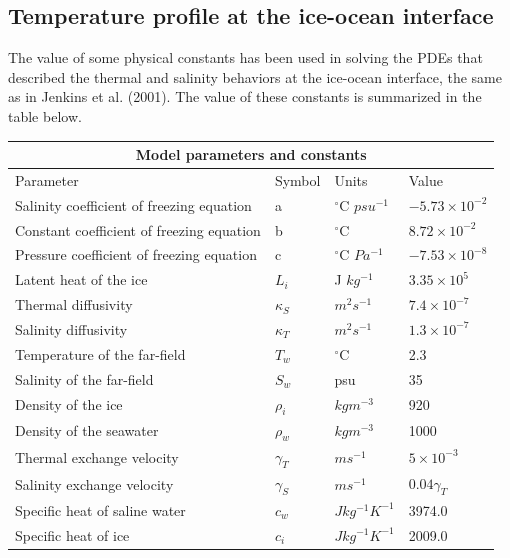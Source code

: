 \documentclass[11pt,a4paper]{article}
\begin{document}
	\subsection{Temperature profile at the ice-ocean interface}
	
	The value of some physical constants has been used in solving the PDEs that described the thermal and salinity behaviors at the ice-ocean interface, the same as in Jenkins et al. (2001). The value of these constants is summarized in the table below.\\
	
	\begin{tabular}{ |p{8cm}||p{2cm}|p{3cm}|p{3cm}|}
		\hline
		\multicolumn{4}{|c|}{Model parameters and constants} \\
		\hline
		Parameter &Symbol&Units&Value\\
		\hline
		Salinity coefficient of freezing equation &a& $^{\circ}$C $psu^{-1}$&   $-5.73\times10^{-2}$\\
		Constant coefficient of freezing equation &b&  $^{\circ}$C  & $8.72\times 10^{-2}$\\
		Pressure coefficient of freezing equation& c&$^{\circ}$C $Pa^{-1} $& $-7.53\times10^{-8}$\\
		Latent heat of the ice    & $L_i$ & J $kg^{-1}$& $3.35\times 10^{5}$\\
		Thermal diffusivity& $\kappa_S$  & $m^2 s^{-1}$&$7.4\times 10^{-7}$\\
		Salinity diffusivity & $\kappa_T$  & $m^2 s^{-1}$   &$1.3\times 10^{-7}$\\
		Temperature of the far-field& $T_w$  & $^{\circ}$C & 2.3\\
		Salinity of the far-field&$S_w$& psu&  35  \\
		Density of the ice & $\rho_i$& $kg m^{-3}$& 920\\
		Density of the seawater & $\rho_w$ & $kg m^{-3}$& 1000\\
		Thermal exchange velocity & $\gamma_T$ & $m s^{-1}$& $5\times 10^{-3}$\\
		Salinity exchange velocity & $\gamma_S$ & $m s^{-1}$& $0.04\gamma_T$ \\
		Specific heat of saline water& $c_w$ & $J kg^{-1}K^{-1}$ & 3974.0\\
		Specific heat of ice & $c_i$ & $J kg^{-1} K^{-1}$ & 2009.0\\
		\hline
	\end{tabular}
    
\end{document}
